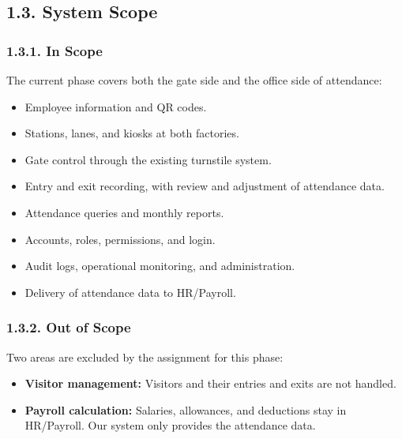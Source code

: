 \subsection*{1.3. System Scope}

{}

\subsubsection*{1.3.1. In Scope}

{}

The current phase covers both the gate side and the office side of attendance:

\begin{itemize}[leftmargin=36pt, itemsep=2pt, topsep=4pt, parsep=2pt]
  \item Employee information and QR codes.
  \item Stations, lanes, and kiosks at both factories.
  \item Gate control through the existing turnstile system.
  \item Entry and exit recording, with review and adjustment of attendance data.
  \item Attendance queries and monthly reports.
  \item Accounts, roles, permissions, and login.
  \item Audit logs, operational monitoring, and administration.
  \item Delivery of attendance data to HR/Payroll.
\end{itemize}

\subsubsection*{1.3.2. Out of Scope}

{}

Two areas are excluded by the assignment for this phase:

\begin{itemize}[leftmargin=36pt, itemsep=2pt, topsep=4pt, parsep=2pt]
  \item \textbf{Visitor management:} Visitors and their entries and exits are not handled.
  \item \textbf{Payroll calculation:} Salaries, allowances, and deductions stay in HR/Payroll. Our system only provides the attendance data.
\end{itemize}

